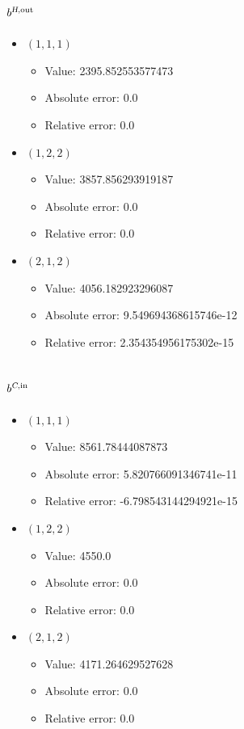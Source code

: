 \documentclass{article}%
\begin{document}
\subsection{$b^{\textsl{H},\text{out}}$}%
\begin{itemize}%
	\item $(1, 1, 1)$%
	\begin{itemize}%
		\item Value: 2395.852553577473%
		\item Absolute error: 0.0%
		\item Relative error: 0.0%
	\end{itemize}%
	\item $(1, 2, 2)$%
	\begin{itemize}%
		\item Value: 3857.856293919187%
		\item Absolute error: 0.0%
		\item Relative error: 0.0%
	\end{itemize}%
	\item $(2, 1, 2)$%
	\begin{itemize}%
		\item Value: 4056.182923296087%
		\item Absolute error: 9.549694368615746e-12%
		\item Relative error: 2.354354956175302e-15%
	\end{itemize}%
\end{itemize}%
\subsection{$b^{\textsl{C},\text{in}}$}%
\begin{itemize}%
	\item $(1, 1, 1)$%
	\begin{itemize}%
		\item Value: 8561.78444087873%
		\item Absolute error: 5.820766091346741e-11%
		\item Relative error: -6.798543144294921e-15%
	\end{itemize}%
	\item $(1, 2, 2)$%
	\begin{itemize}%
		\item Value: 4550.0%
		\item Absolute error: 0.0%
		\item Relative error: 0.0%
	\end{itemize}%
	\item $(2, 1, 2)$%
	\begin{itemize}%
		\item Value: 4171.264629527628%
		\item Absolute error: 0.0%
		\item Relative error: 0.0%
	\end{itemize}%
\end{itemize}%
\end{document}

